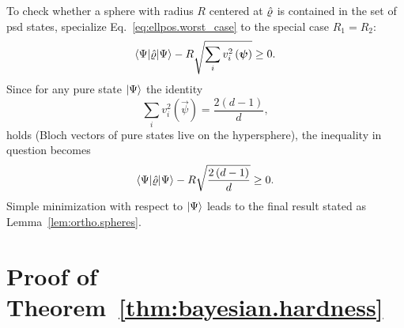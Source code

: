 To check whether a sphere with radius $R$ centered at $\hat{\varrho}$ is contained in the set of psd states, specialize Eq.~\eqref{eq:ellpos.worst_case} to the special case $R_1 = R_2$:
\begin{equation}
  \bra{\Psi}\estim{\varrho} \ket{\Psi} -R\sqrt{\sum_{i}v_{i}^2\left(\vec\psi\right)}\geq0.
 \label{eq:spheres.worst_case}
\end{equation}
Since for any pure state $ \ket{\Psi} $ the identity
\begin{equation}
  \sum_{i}v_{i}^{2}\left(\vec\psi\right)=\frac{2\left(d-1\right)}{d},\label{puresum-1}
\end{equation}
holds (Bloch vectors of pure states live on the hypersphere), the inequality in question becomes
\begin{equation}
  \bra{\Psi}\estim{\varrho} \ket{\Psi} -R\sqrt{\frac{2\left(d-1\right)}{d}}\geq0.
\end{equation}
Simple minimization with respect to $ \ket{\Psi} $ leads to the final result stated as Lemma~\ref{lem:ortho.spheres}.



\section{Proof of Theorem~\ref{thm:bayesian.hardness}}
\label{sec:proof_bayesian}

